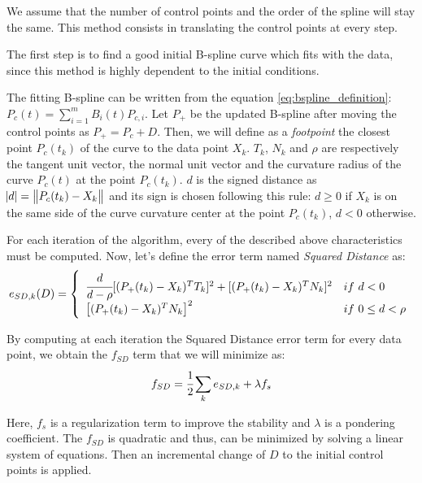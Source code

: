 \documentclass{article}
\newcommand{\vsp}{\vspace{\baselineskip}}
\begin{document}
We assume that the number of control points and the order of the spline will stay the same. This method consists in translating the control points at every step.

\vsp

The first step is to find a good initial B-spline curve which fits with the data, since this method is highly dependent to the initial conditions.

\vsp

The fitting B-spline can be written from the equation \ref{eq:bspline_definition}: $P_c(t)=\sum\limits_{i=1}^m B_i(t)P_{c,i}$. Let $P_+$ be the updated B-spline after moving the control points as $P_+=P_c+D$. Then, we will define as a \textit{footpoint} the closest point $P_c(t_k)$ of the curve to the data point $X_k$. $T_k$, $N_k$ and $\rho$ are respectively the tangent unit vector, the normal unit vector and the curvature radius of the curve $P_c(t)$ at the point $P_c(t_k)$. $d$ is the signed distance as $\abs{d} = \left\lVert P_c(t_k) - X_k \right\rVert$ and its sign is chosen following this rule: $d \geq 0$ if $X_k$ is on the same side of the curve curvature center at the point $P_c(t_k)$, $d < 0$ otherwise. 

\vsp

For each iteration of the algorithm, every of the described above characteristics must be computed. Now, let's define the error term named \textit{Squared Distance} as:
\begin{equation}
    \label{eq:error_term}
    e_{SD,k}(D) = 
    \left \{
    \begin{array}{l l}
        \cfrac{d}{d-\rho}[(P_+(t_k)-X_k)^T T_k]^2 + [(P_+(t_k)-X_k)^T N_k]^2 & if\ d < 0 \\
        \big[(P_+(t_k)-X_k)^T N_k\big]^2 & if\ 0 \leq d < \rho 
    \end{array}
    \right .
\end{equation}

By computing at each iteration the Squared Distance error term for every data point, we obtain the $f_{SD}$ term that we will minimize as:
\begin{equation}
    \label{eq:fsd}
    f_{SD} = \cfrac{1}{2} \sum_{k} e_{SD,k} + \lambda f_s
\end{equation}

Here, $f_s$ is a regularization term to improve the stability and $\lambda$ is a pondering coefficient. The $f_{SD}$ is quadratic and thus, can be minimized by solving a linear system of equations. Then an incremental change of $D$ to the initial control points is applied.
\end{document}
